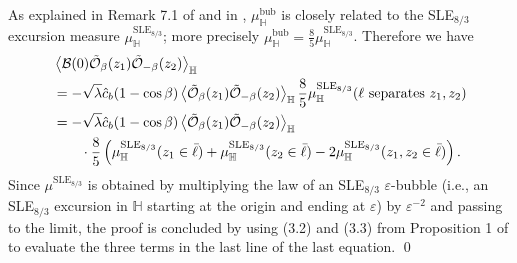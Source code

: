 \documentclass[a4paper,11pt]{article}
\begin{document}
As explained in Remark 7.1 of \cite{Lawler_2003} and in \cite{beliaev2013some}, $\mu^{\text{bub}}_{\mathbb{H}}$ is closely related to the SLE$_{8/3}$ excursion measure $\mu^{\text{SLE}_{8/3}}_{\mathbb{H}}$; more precisely $\mu^{\text{bub}}_{\mathbb{H}} = \frac{8}{5} \mu^{\text{SLE}_{8/3}}_{\mathbb{H}}$. Therefore we have
\begin{align}
\begin{split} \label{eq:OOB-SLE}
& \Braket{ \mathcal{B}(0) \tilde{\mathcal{O}}_{\beta}(z_1) \tilde{\mathcal{O}}_{-\beta}(z_2) }_{\mathbb{H}} \\
&= - \sqrt{\lambda} \hat{c}_b (1-\cos\beta) \Braket{\tilde{\mathcal{O}}_{\beta}(z_1) \tilde{\mathcal{O}}_{-\beta}(z_2)}_{\mathbb{H}} \frac{8}{5} \mu^{\text{SLE}_{8/3}}_{\mathbb{H}}(\ell \text{ separates } z_1,z_2) \\
&= - \sqrt{\lambda} \hat{c}_b (1-\cos\beta) \Braket{\tilde{\mathcal{O}}_{\beta}(z_1) \tilde{\mathcal{O}}_{-\beta}(z_2)}_{\mathbb{H}} \\
& \qquad \cdot \frac{8}{5} \left( \mu^{\text{SLE}_{8/3}}_{\mathbb{H}}(z_1 \in \bar\ell) + \mu^{\text{SLE}_{8/3}}_{\mathbb{H}}(z_2 \in \bar\ell) -2 \mu^{\text{SLE}_{8/3}}_{\mathbb{H}}(z_1,z_2 \in \bar\ell) \right).
\end{split}
\end{align}
Since $\mu^{\text{SLE}_{8/3}}$ is obtained by multiplying the law of an SLE$_{8/3}$ 
$\varepsilon$-bubble (i.e., an SLE$_{8/3}$ excursion in $\mathbb{H}$ starting at the origin and ending at $\varepsilon$) by $\varepsilon^{-2}$ and passing to the limit, the proof is concluded by using (3.2) and (3.3) from Proposition 1 of \cite{beliaev2013some} to evaluate the three terms in the last line of the last equation. \qed

\medskip
\end{document}
